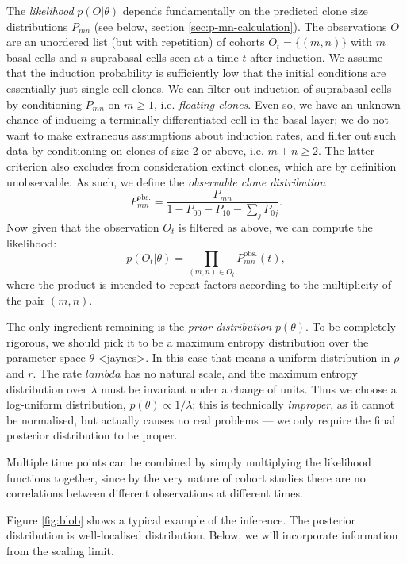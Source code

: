 \documentclass[10pt,UKenglish]{article}
\begin{document}
The \emph{likelihood} $p(O|\theta)$ depends fundamentally on the predicted clone
size distributions $P_{mn}$ (see below, section \ref{sec:p-mn-calculation}). The
observations $O$ are an unordered list (but with repetition) of cohorts $O_t =
\{(m,n)\}$ with $m$ basal cells and $n$ suprabasal cells seen at a time $t$
after induction. We assume that the induction probability is sufficiently low
that the initial conditions are essentially just single cell clones. We can
filter out induction of suprabasal cells by conditioning $P_{mn}$ on $m \ge 1$,
i.e. \emph{floating clones}. Even so, we have an unknown chance of inducing a
terminally differentiated cell in the basal layer; we do not want to make
extraneous assumptions about induction rates, and filter out such data by
conditioning on clones of size 2 or above, i.e. $m+n \ge 2$. The latter
criterion also excludes from consideration extinct clones, which are by
definition unobservable. As such, we define the \emph{observable clone
distribution} $$P^\textrm{obs.}_{mn} = \frac{P_{mn}}{1 - P_{00} - P_{10} -
\sum_j P_{0j}}.$$ Now given that the observation $O_t$ is filtered as above, we
can compute the likelihood: $$p(O_t|\theta) = \prod_{(m,n) \in O_t}
P^\textrm{obs.}_{mn}(t),$$ where the product is intended to repeat factors
according to the multiplicity of the pair $(m,n)$.

The only ingredient remaining is the \emph{prior distribution} $p(\theta)$. To
be completely rigorous, we should pick it to be a maximum entropy distribution
over the parameter space $\theta$ <jaynes>. In this case that means a uniform
distribution in $\rho$ and $r$. The rate $lambda$ has no natural scale, and the
maximum entropy distribution over $\lambda$ must be invariant under a change of
units. Thus we choose a log-uniform distribution, $p(\theta) \propto 1/\lambda$;
this is technically \emph{improper}, as it cannot be normalised, but actually
causes no real problems --- we only require the final posterior distribution to
be proper.

Multiple time points can be combined by simply multiplying the likelihood
functions together, since by the very nature of cohort studies there are no
correlations between different observations at different times.

Figure \ref{fig:blob} shows a typical example of the inference. The posterior
distribution is well-localised distribution. Below, we will incorporate
information from the scaling limit.
\end{document}
